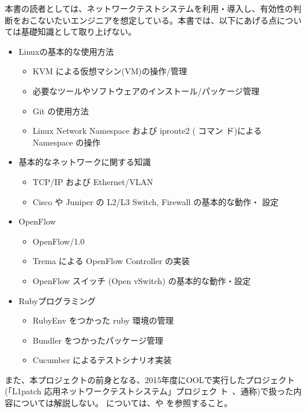 本書の読者としては、ネットワークテストシステムを利用・導入し、有効性の判
断をおこないたいエンジニアを想定している。本書では、以下にあげる点につい
ては基礎知識として取り上げない。

\begin{itemize}
 \item Linuxの基本的な使用方法
       \begin{itemize}
        \item KVM による仮想マシン(VM)の操作/管理
        \item 必要なツールやソフトウェアのインストール/パッケージ管理
        \item Git の使用方法
        \item Linux Network Namespace および iproute2 (  コマン
              ド)によるNamespace の操作
       \end{itemize}
 \item 基本的なネットワークに関する知識
       \begin{itemize}
        \item TCP/IP および Ethernet/VLAN
        \item Cisco や Juniper の L2/L3 Switch, Firewall の基本的な動作・
              設定
       \end{itemize}
 \item OpenFlow
       \begin{itemize}
        \item OpenFlow/1.0
        \item Trema による OpenFlow Controller の実装
        \item OpenFlow スイッチ (Open vSwitch) の基本的な動作・設定
       \end{itemize}
 \item Rubyプログラミング
       \begin{itemize}
        \item RubyEnv をつかった ruby 環境の管理
        \item Bundler をつかったパッケージ管理
        \item Cucumber によるテストシナリオ実装
       \end{itemize}
\end{itemize}

また、本プロジェクトの前身となる、2015年度にOOLで実行したプロジェクト
(「L1patch 応用ネットワークテストシステム」プロジェク
ト~\cite{ool-l1pj-web}、通称\lopj)で扱った内容については解説しない。
\lopj については、\lopjpoc や \lopjtech を参照すること。

